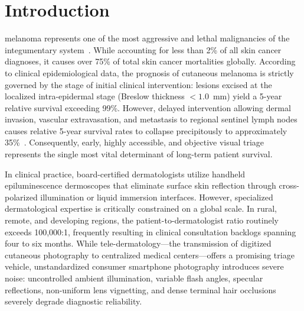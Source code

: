 \documentclass[conference]{IEEEtran}
\begin{document}
\section{Introduction}
 melanoma represents one of the most aggressive and lethal malignancies of the integumentary system~\cite{codella2018skin}. While accounting for less than 2\% of all skin cancer diagnoses, it causes over 75\% of total skin cancer mortalities globally. According to clinical epidemiological data, the prognosis of cutaneous melanoma is strictly governed by the stage of initial clinical intervention: lesions excised at the localized intra-epidermal stage (Breslow thickness $<1.0$~mm) yield a 5-year relative survival exceeding 99\%. However, delayed intervention allowing dermal invasion, vascular extravasation, and metastasis to regional sentinel lymph nodes causes relative 5-year survival rates to collapse precipitously to approximately 35\%~\cite{stolz1994abcd}. Consequently, early, highly accessible, and objective visual triage represents the single most vital determinant of long-term patient survival.

In clinical practice, board-certified dermatologists utilize handheld epiluminescence dermoscopes that eliminate surface skin reflection through cross-polarized illumination or liquid immersion interfaces. However, specialized dermatological expertise is critically constrained on a global scale. In rural, remote, and developing regions, the patient-to-dermatologist ratio routinely exceeds 100,000:1, frequently resulting in clinical consultation backlogs spanning four to six months. While tele-dermatology—the transmission of digitized cutaneous photography to centralized medical centers—offers a promising triage vehicle, unstandardized consumer smartphone photography introduces severe noise: uncontrolled ambient illumination, variable flash angles, specular reflections, non-uniform lens vignetting, and dense terminal hair occlusions severely degrade diagnostic reliability.
\end{document}
